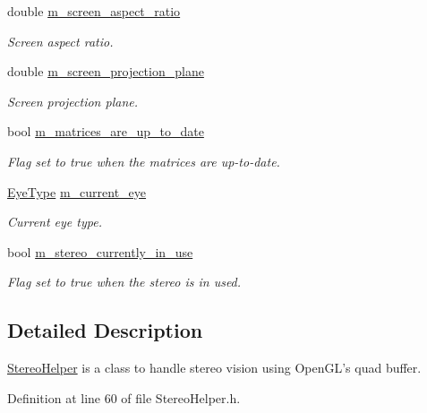 \begin{DoxyCompactItemize}
double \hyperlink{class_graphics_1_1_stereo_helper_add543d27ae84db5cbcb664c7c7c08e3b}{m\_\-screen\_\-aspect\_\-ratio}
\begin{DoxyCompactList}\small\item\em Screen aspect ratio. \end{DoxyCompactList}\item 
double \hyperlink{class_graphics_1_1_stereo_helper_a0049a88c84fd0b377b69f6cb7cd4ab86}{m\_\-screen\_\-projection\_\-plane}
\begin{DoxyCompactList}\small\item\em Screen projection plane. \end{DoxyCompactList}\item 
bool \hyperlink{class_graphics_1_1_stereo_helper_a83274d674fe2f833ecab9dc67a32c64d}{m\_\-matrices\_\-are\_\-up\_\-to\_\-date}
\begin{DoxyCompactList}\small\item\em Flag set to true when the matrices are up-\/to-\/date. \end{DoxyCompactList}\item 
\hyperlink{class_graphics_1_1_stereo_helper_a29cdc9bdc1c46342adb6e0b06d6ee49a}{EyeType} \hyperlink{class_graphics_1_1_stereo_helper_aa32df0fd8c66f7fb8e3922f6413bb421}{m\_\-current\_\-eye}
\begin{DoxyCompactList}\small\item\em Current eye type. \end{DoxyCompactList}\item 
bool \hyperlink{class_graphics_1_1_stereo_helper_a01fb4aa644375cbdeb6fe98aa2c42452}{m\_\-stereo\_\-currently\_\-in\_\-use}
\begin{DoxyCompactList}\small\item\em Flag set to true when the stereo is in used. \end{DoxyCompactList}\end{DoxyCompactItemize}


\subsection{Detailed Description}
\hyperlink{class_graphics_1_1_stereo_helper}{StereoHelper} is a class to handle stereo vision using OpenGL's quad buffer. 

Definition at line 60 of file StereoHelper.h.



